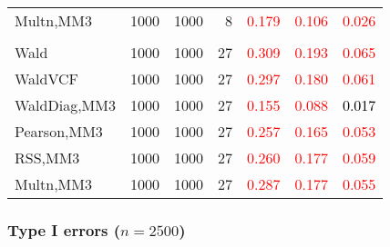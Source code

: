 \documentclass[
]{article}
\begin{document}
\begin{table}[H]
{\begin{tabular}[t]{lrrrrrr}
\hspace{1em}Multn,MM3 & 1000 & 1000 & 8 & \textcolor{red}{0.179} & \textcolor{red}{0.106} & \textcolor{red}{0.026}\\
\addlinespace[0.3em]
\multicolumn{7}{l}{\textbf{3F 15V}}\\
\hspace{1em}Wald & 1000 & 1000 & 27 & \textcolor{red}{0.309} & \textcolor{red}{0.193} & \textcolor{red}{0.065}\\
\hspace{1em}WaldVCF & 1000 & 1000 & 27 & \textcolor{red}{0.297} & \textcolor{red}{0.180} & \textcolor{red}{0.061}\\
\hspace{1em}WaldDiag,MM3 & 1000 & 1000 & 27 & \textcolor{red}{0.155} & \textcolor{red}{0.088} & \textcolor{black}{0.017}\\
\hspace{1em}Pearson,MM3 & 1000 & 1000 & 27 & \textcolor{red}{0.257} & \textcolor{red}{0.165} & \textcolor{red}{0.053}\\
\hspace{1em}RSS,MM3 & 1000 & 1000 & 27 & \textcolor{red}{0.260} & \textcolor{red}{0.177} & \textcolor{red}{0.059}\\
\hspace{1em}Multn,MM3 & 1000 & 1000 & 27 & \textcolor{red}{0.287} & \textcolor{red}{0.177} & \textcolor{red}{0.055}\\
\bottomrule
\end{tabular}}
\endgroup{}
\end{table}

\hypertarget{type-i-errors-n2500-1}{%
\subsubsection{\texorpdfstring{Type I errors
(\(n=2500\))}{Type I errors (n=2500)}}\label{type-i-errors-n2500-1}}
\end{document}
